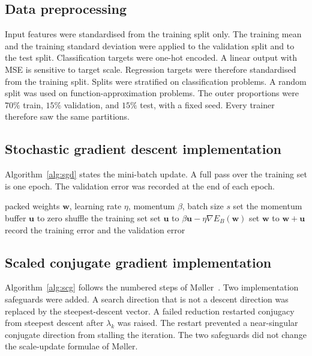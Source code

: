 \documentclass[conference,10pt]{IEEEtran}
\begin{document}
\subsection{Data preprocessing}
\label{sec:prep}
Input features were standardised from the training split only.
The training mean and the training standard deviation were applied to the validation split and to the test split.
Classification targets were one-hot encoded.
A linear output with MSE is sensitive to target scale.
Regression targets were therefore standardised from the training split.
Splits were stratified on classification problems.
A random split was used on function-approximation problems.
The outer proportions were $70\%$ train, $15\%$ validation, and $15\%$ test, with a fixed seed.
Every trainer therefore saw the same partitions.

\subsection{Stochastic gradient descent implementation}
\label{sec:sgd-impl}
Algorithm~\ref{alg:sgd} states the mini-batch update.
A full pass over the training set is one epoch.
The validation error was recorded at the end of each epoch.

\begin{algorithm}[t]
\caption{Mini-batch stochastic gradient descent}
\label{alg:sgd}
\begin{algorithmic}[1]
\Require packed weights $\mathbf{w}$, learning rate $\eta$, momentum $\beta$, batch size $s$
\State set the momentum buffer $\mathbf{u}$ to zero
  \State shuffle the training set
    \State set $\mathbf{u}$ to $\beta\mathbf{u}-\eta\nabla E_{B}(\mathbf{w})$
    \State set $\mathbf{w}$ to $\mathbf{w}+\mathbf{u}$
  \EndFor
  \State record the training error and the validation error
\EndFor
\end{algorithmic}
\end{algorithm}

\subsection{Scaled conjugate gradient implementation}
Algorithm~\ref{alg:scg} follows the numbered steps of M{\o}ller~\cite{moller1993}.
Two implementation safeguards were added.
A search direction that is not a descent direction was replaced by the steepest-descent vector.
A failed reduction restarted conjugacy from steepest descent after $\lambda_{k}$ was raised.
The restart prevented a near-singular conjugate direction from stalling the iteration.
The two safeguards did not change the scale-update formulae of M{\o}ller.
\end{document}
